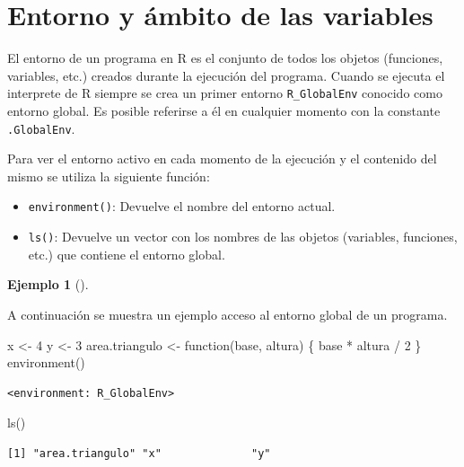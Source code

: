 \documentclass[
  a4paper,
]{scrreport}
\newenvironment{Shaded}{\begin{snugshade}}{\end{snugshade}}
\newcommand{\ControlFlowTok}[1]{\textcolor[rgb]{0.00,0.23,0.31}{#1}}
\newcommand{\DecValTok}[1]{\textcolor[rgb]{0.68,0.00,0.00}{#1}}
\newcommand{\FunctionTok}[1]{\textcolor[rgb]{0.28,0.35,0.67}{#1}}
\newcommand{\NormalTok}[1]{\textcolor[rgb]{0.00,0.23,0.31}{#1}}
\newcommand{\OtherTok}[1]{\textcolor[rgb]{0.00,0.23,0.31}{#1}}
\newcommand{\SpecialCharTok}[1]{\textcolor[rgb]{0.37,0.37,0.37}{#1}}
\providecommand{\tightlist}{%
  \setlength{\itemsep}{0pt}\setlength{\parskip}{0pt}}\usepackage{longtable,booktabs,array}
\theoremstyle{definition}
\theoremstyle{definition}
\newtheorem{example}{Ejemplo}[chapter]
\theoremstyle{remark}
\begin{document}
\hypertarget{entorno-y-uxe1mbito-de-las-variables}{%
\section{Entorno y ámbito de las
variables}\label{entorno-y-uxe1mbito-de-las-variables}}

El entorno de un programa en R es el conjunto de todos los objetos
(funciones, variables, etc.) creados durante la ejecución del programa.
Cuando se ejecuta el interprete de R siempre se crea un primer entorno
\texttt{R\_GlobalEnv} conocido como entorno global. Es posible referirse
a él en cualquier momento con la constante \texttt{.GlobalEnv}.

Para ver el entorno activo en cada momento de la ejecución y el
contenido del mismo se utiliza la siguiente función:

\begin{itemize}
\tightlist
\item
  \texttt{environment()}: Devuelve el nombre del entorno actual.
\item
  \texttt{ls()}: Devuelve un vector con los nombres de las objetos
  (variables, funciones, etc.) que contiene el entorno global.
\end{itemize}

\leavevmode{}%
\begin{example}[]\label{exm-acceso-entorno-global}

A continuación se muestra un ejemplo acceso al entorno global de un
programa.

\begin{Shaded}
\begin{Highlighting}[]
\NormalTok{x }\OtherTok{\textless{}{-}} \DecValTok{4}
\NormalTok{y }\OtherTok{\textless{}{-}} \DecValTok{3}
\NormalTok{area.triangulo }\OtherTok{\textless{}{-}} \ControlFlowTok{function}\NormalTok{(base, altura) \{}
\NormalTok{  base }\SpecialCharTok{*}\NormalTok{ altura }\SpecialCharTok{/} \DecValTok{2}
\NormalTok{\}}
\FunctionTok{environment}\NormalTok{()}
\end{Highlighting}
\end{Shaded}

\begin{verbatim}
<environment: R_GlobalEnv>
\end{verbatim}

\begin{Shaded}
\begin{Highlighting}[]
\FunctionTok{ls}\NormalTok{()}
\end{Highlighting}
\end{Shaded}

\begin{verbatim}
[1] "area.triangulo" "x"              "y"             
\end{verbatim}

\end{example}
\end{document}
